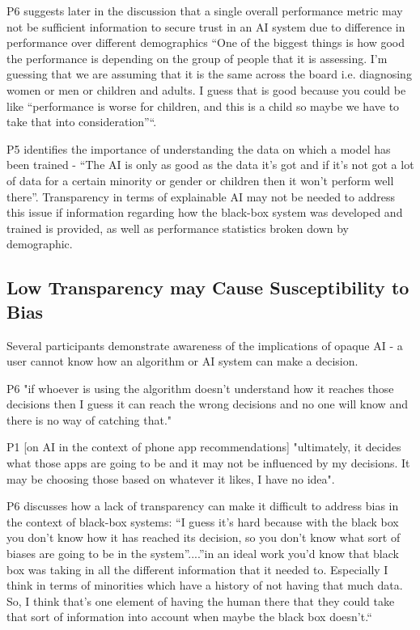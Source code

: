 \documentclass[manuscript,screen,review]{acmart}
\begin{document}
P6 suggests later in the discussion that a single overall performance metric may not be sufficient information to secure trust in an AI system due to difference in performance over different demographics “One of the biggest things is how good the performance is depending on the group of people that it is assessing. I'm guessing that we are assuming that it is the same across the board i.e. diagnosing women or men or children and adults. I guess that is good because you could be like “performance is worse for children, and this is a child so maybe we have to take that into consideration”“. 

P5 identifies the importance of understanding the data on which a model has been trained -
 “The AI is only as good as the data it's got and if it's not got a lot of data for a certain minority or gender or children then it won't perform well there”. Transparency in terms of explainable AI may not be needed to address this issue if information regarding how the black-box system was developed and trained is provided, as well as performance statistics broken down by demographic.


\subsection{Low Transparency may Cause Susceptibility to Bias} 
Several participants demonstrate awareness of the implications of opaque AI - a user cannot know how an algorithm or AI system can make a decision.

P6  "if whoever is using the algorithm doesn’t understand how it reaches those decisions then I guess it can reach the wrong decisions and no one will know and there is no way of catching that." 

P1 [on AI in the context of phone app recommendations]  "ultimately, it decides what those apps are going to be and it may not be influenced by my decisions. It may be choosing those based on whatever it likes, I have no idea".

P6 discusses how a lack of transparency can make it difficult to address bias in the context of black-box systems: “I guess it's hard because with the black box you don’t know how it has reached its decision, so you don’t know what sort of biases are going to be in the system”....”in an ideal work you'd know that black box was taking in all the different information that it needed to. Especially I think in terms of minorities which have a history of not having that much data. So, I think that’s one element of having the human there that they could take that sort of information into account when maybe the black box doesn’t.“
\end{document}
